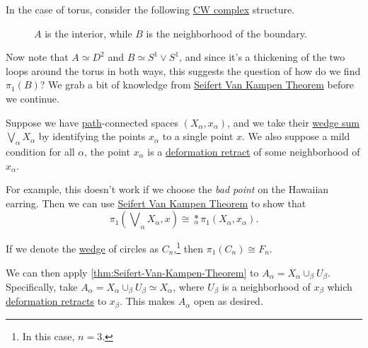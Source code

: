 \begin{explanation}
	In the case of torus, consider the following \hyperref[def:CW-Complex]{CW complex} structure.
	\begin{figure}[H]
		\centering
		\caption{\(A\) is the interior, while \(B\) is the neighborhood of the boundary.}
		\label{fig:lec11-eg2:torus}
	\end{figure}
	Now note that \(A\simeq D^{2} \) and \(B\simeq S^1\vee S^1\), and since it's a thickening of the two loops around the torus in
	both ways, this suggests the question of how do we find \(\pi _1(B)\)? We grab a bit of knowledge from \hyperref[thm:Seifert-Van-Kampen-Theorem]{Seifert Van Kampen Theorem}
	before we continue.


	\begin{exercise}
		Suppose we have \hyperref[def:path]{path}-connected spaces \((X_\alpha , x_\alpha )\), and we take their \hyperref[CW-complex-wedge-sum]{wedge sum} \(\bigvee_\alpha X_\alpha \) by
		identifying the points \(x_\alpha \) to a single point \(x\). We also suppose a mild condition for all \(\alpha\), the point
		\(x_\alpha \) is a \hyperref[def:deformation-retraction]{deformation retract} of some neighborhood of \(x_\alpha \).

		\par For example, this doesn't work if we choose the \emph{bad point} on the Hawaiian earring. Then we can use \hyperref[thm:Seifert-Van-Kampen-Theorem]{Seifert Van Kampen Theorem}
		to show that
		\[
			\pi _1\left(\bigvee\nolimits_\alpha X_\alpha , x\right) \cong \underset{\alpha }{\ast}\pi _1\left(X_\alpha , x_\alpha \right).
		\]
	\end{exercise}
	\begin{answer}
		If we denote the \hyperref[CW-complex-wedge-sum]{wedge} of circles as \(C_n\),\footnote{In this case, \(n=3\).} then \(\pi _1(C_n)\cong F_n\).
		\begin{figure}[H]
			\centering
			\label{fig:eg-2:Seifert-Van-Kampen-Theorem}
		\end{figure}
		We can then apply \autoref{thm:Seifert-Van-Kampen-Theorem} to \(A_\alpha = X_\alpha \cup_{\beta }U_\beta \).
		Specifically, take \(A_\alpha = X_\alpha \cup_\beta U_\beta \simeq X_\alpha \), where \(U_\beta \) is a neighborhood of \(x_\beta \) which
		\hyperref[def:deformation-retraction]{deformation retracts} to \(x_\beta \). This makes \(A_\alpha \) open as desired.
	\end{answer}


\end{explanation}
